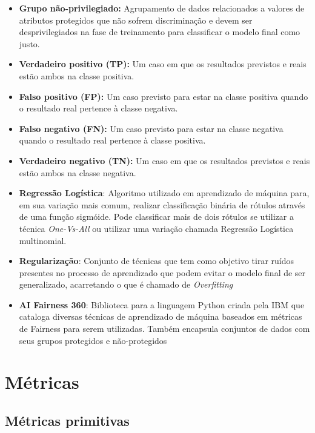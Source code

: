 \documentclass[portugues, 12pt, a4paper]{article}
\begin{document}
\begin{itemize}
\item \textbf{Grupo não-privilegiado:} Agrupamento de dados relacionados a valores de atributos protegidos que não sofrem discriminação e devem ser desprivilegiados na fase de treinamento para classificar o modelo final como justo.

\item \textbf{Verdadeiro positivo (TP):} Um caso em que os resultados previstos e reais estão ambos na classe positiva.

\item \textbf{Falso positivo (FP):} Um caso previsto para estar na classe positiva
quando o resultado real pertence à classe negativa.

\item \textbf{Falso negativo (FN):} Um caso previsto para estar na classe negativa
quando o resultado real pertence à classe positiva.

\item \textbf{Verdadeiro negativo (TN):} Um caso em que os resultados previstos e reais estão ambos na classe negativa.

\item \textbf{Regressão Logística}: Algoritmo utilizado em aprendizado de máquina para, em sua variação mais comum, realizar classificação binária de rótulos através de uma função sigmóide. Pode classificar mais de dois rótulos se utilizar a técnica \textit{One-Vs-All} ou utilizar uma variação chamada Regressão Logística multinomial.

\item \textbf{Regularização}: Conjunto de técnicas que tem como objetivo tirar ruídos presentes no processo de aprendizado que podem evitar o modelo final de ser generalizado, acarretando o que é chamado de \textit{Overfitting}

\item \textbf{AI Fairness 360}: Biblioteca para a linguagem Python criada pela IBM que cataloga diversas técnicas de aprendizado de máquina baseados em métricas de Fairness para serem utilizadas. Também encapsula conjuntos de dados com seus grupos protegidos e não-protegidos
\end{itemize}

\section{Métricas}

\subsection{Métricas primitivas}
\end{document}

